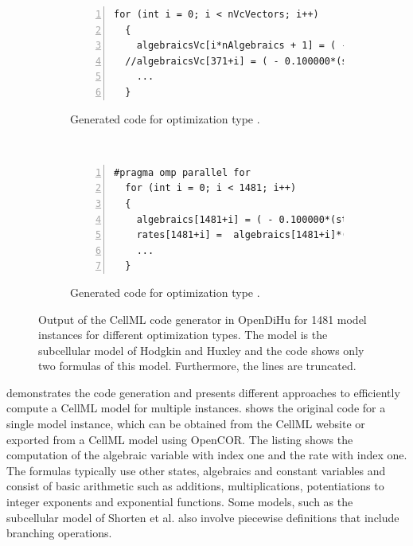 \begin{figure}
\begin{subfigure}[t]{\textwidth}
\begin{framed}
\begin{lstlisting}[basicstyle=\footnotesize\ttfamily,commentstyle=\color{gray},numbers=left]
  for (int i = 0; i < nVcVectors; i++)
  {
    algebraicsVc[i*nAlgebraics + 1] = ( - 0.100000*(statesVc[i*nStates + 0]+50.000 $\label{alg:b_aovs}$
  //algebraicsVc[371+i] = ( - 0.100000*(statesVc[0+i]+50.0000))/(exponential(- (st $\label{alg:b_sova}$
    ...
  }
\end{lstlisting}
\end{framed}
    \caption{Generated code for optimization type .}%
    \label{fig:cellml_codes_vc}%
  \end{subfigure}\\[4mm]
  \begin{subfigure}[t]{\textwidth}%
  \centering%
\begin{framed}
\begin{lstlisting}[basicstyle=\footnotesize\ttfamily,commentstyle=\color{gray},numbers=left]
  #pragma omp parallel for
  for (int i = 0; i < 1481; i++)
  {
    algebraics[1481+i] = ( - 0.100000*(states[0+i]+50.0000))/(exp(- (states[0+i]+5
    rates[1481+i] =  algebraics[1481+i]*(1.00000 - states[1481+i]) -  algebraics[7
    ...
  }
\end{lstlisting}
\end{framed}
    \caption{Generated code for optimization type .}%
    \label{fig:cellml_codes_openmp}%
  \end{subfigure}
\caption{Output of the CellML code generator in OpenDiHu for 1481 model instances for different optimization types.  The model is the subcellular model of Hodgkin and Huxley and the code shows only two formulas of this model. Furthermore, the lines are truncated.}%
\label{fig:cellml_codes}%
\end{figure}

 demonstrates the code generation and presents different approaches to efficiently compute a CellML model for multiple instances.  shows the original code for a single model instance, which can be obtained from the CellML website or exported from a CellML model using OpenCOR. The listing shows the computation of the algebraic variable with index one and the rate with index one. The formulas typically use other states, algebraics and constant variables and consist of basic arithmetic such as additions, multiplications, potentiations to integer exponents and exponential functions. Some models, such as the subcellular model of Shorten et al. \cite{shorten2007mathematical} also involve piecewise definitions that include  branching operations.

